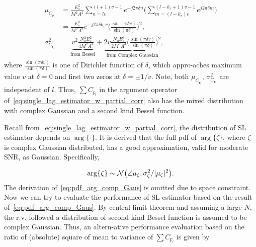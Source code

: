 \begin{equation}
  \begin{aligned}
  \label{eq:mean_var_product_coherent_int}
  \mu_{C_{\digamma_l}}&=\frac{E_s^2}{M^2A^2}\sum_{n=lv}^{(l+1)v-1}e^{-j2\pi \delta n}\bigg(\sum_{m=(l-k_v)v}^{(l-k_v+1)v-1}e^{j2\pi \delta m}\bigg) \\
  &=\frac{E_s^2}{M^2A^2}e^{-j2\pi \delta k_vv}\bigg(\frac{\sin(\pi \delta v)}{\sin(\pi \delta)}\bigg)^2, \\
  \sigma^2_{C_{\digamma_l}}&={\underbrace{v^2\frac{N_0^2E_s^2}{4M^2A^4}}_{\text{from Bessel}}}+{\underbrace{2v\frac{N_0E_s^3}{2M^3A^4}\bigg(\frac{\sin(\pi \delta v)}{\sin(\pi \delta)}\bigg)^2}_{\text{from Complex Gaussian}}},
  \end{aligned}
\end{equation}
where $\frac{\sin(\pi \delta v)}{\sin(\pi \delta)}$ is one of Dirichlet function of $\delta$, which appro-aches
maximum value $v$ at $\delta{=}0$ and first two zeros at $\delta{=}\pm 1/v$.
Note, both $\mu_{C_{\digamma_l}}$, $\sigma^2_{C_{\digamma_l}}$ are independent of $l$.
Thus, $\sum C_{\digamma_l}$ in the argument operator of~\eqref{eq:single_lag_estimator_w_partial_corr} 
also has the mixed distribution with complex Gaussian and a second kind Bessel function.

Recall from~\eqref{eq:single_lag_estimator_w_partial_corr}, the distribution of SL estimator depends on $\arg\{\cdot\}$.
It is derived that the full pdf of $\arg\{\zeta\}$, where $\zeta$ is complex Gaussian distributed, has a good approximation, valid for moderate SNR, as Gaussian.
Specifically,

\begin{equation}
  \label{eq:pdf_arg_comp_Gaus}
  \arg\{\zeta\} \sim \mathcal{N}\big(\angle \mu_{\zeta},\sigma^2_{\zeta}/|\mu_{\zeta}|^2\big).
\end{equation}
The derivation of~\eqref{eq:pdf_arg_comp_Gaus} is omitted due to space constraint.
Now we can try to evaluate the performance of SL estimator based on the result of~\eqref{eq:pdf_arg_comp_Gaus}.
By central limit theorem and assuming a large $N$, the r.v. followed a distribution of second kind Bessel function
is assumed to be complex Gaussian. Thus, an altern-ative performance evaluation 
based on the ratio of (absolute) square of mean to variance of $\sum C_{\digamma_l}$ is given by 

